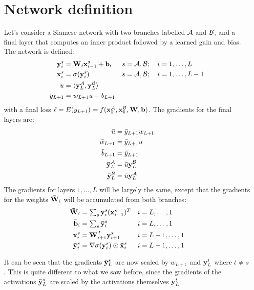 \section{Network definition}

Let's consider a Siamese network with two branches labelled $\mathcal{A}$ and $\mathcal{B}$, and a final layer that computes an inner product followed by a learned gain and bias.
The network is defined:
\begin{align}
\boldsymbol{\mathbf{y}}_{i}^{s} & = \boldsymbol{\mathbf{W}}_{i} \boldsymbol{\mathbf{x}}_{i - 1}^{s} + \boldsymbol{\mathbf{b}}_{i} && s = \mathcal{A}, \mathcal{B}; \quad i = 1, \dots, L\\
\boldsymbol{\mathbf{x}}_{i}^{s} & = \sigma(\boldsymbol{\mathbf{y}}_{i}^{s}) && s = \mathcal{A}, \mathcal{B}; \quad i = 1, \dots, L - 1 \\
u & = \langle \boldsymbol{\mathbf{y}}_{L}^{\mathcal{A}}, \boldsymbol{\mathbf{y}}_{L}^{\mathcal{B}} \rangle \\
y_{L+1} & = w_{L+1} u + b_{L+1}
\end{align}
with a final loss $\ell = E(y_{L + 1}) = f(\boldsymbol{\mathbf{x}}_{0}^{\mathcal{A}}, \boldsymbol{\mathbf{x}}_{0}^{\mathcal{B}}, \mathbf{W}, \mathbf{b})$.
The gradients for the final layers are:
\begin{align}
\bar{u} & = \bar{y}_{L+1} w_{L+1} \\
\bar{w}_{L+1} & = \bar{y}_{L+1} u \\
\bar{b}_{L+1} & = \bar{y}_{L+1} \\
\boldsymbol{\mathbf{\bar{y}}}_{L}^{\mathcal{A}} & = \bar{u} \boldsymbol{\mathbf{y}}_{L}^{\mathcal{B}} \\
\boldsymbol{\mathbf{\bar{y}}}_{L}^{\mathcal{B}} & = \bar{u} \boldsymbol{\mathbf{y}}_{L}^{\mathcal{A}}
\end{align}
The gradients for layers $1, \dots, L$ will be largely the same, except that the gradients for the weights $\boldsymbol{\mathbf{\bar{W}}}_{i}$ will be accumulated from both branches:
\begin{align}
\boldsymbol{\mathbf{\bar{W}}}_{i} & = \textstyle \sum_{s} \boldsymbol{\mathbf{\bar{y}}}_{i}^{s} (\boldsymbol{\mathbf{x}}_{i - 1}^{s})^T && i = L, \dots, 1 \\
\boldsymbol{\mathbf{\bar{b}}}_{i} & = \textstyle \sum_{s} \boldsymbol{\mathbf{\bar{y}}}_{i}^{s} && i = L, \dots, 1 \\
\boldsymbol{\mathbf{\bar{x}}}_{i}^{s} & = \boldsymbol{\mathbf{W}}_{i + 1}^T \boldsymbol{\mathbf{\bar{y}}}_{i + 1}^{s} && i = L-1, \dots, 1 \\
\boldsymbol{\mathbf{\bar{y}}}_{i}^{s} & = \nabla\sigma(\boldsymbol{\mathbf{y}}_{i}^{s}) \odot \boldsymbol{\mathbf{\bar{x}}}_{i}^{s} && i = L - 1, \dots, 1
\end{align}


It can be seen that the gradients $\boldsymbol{\mathbf{\bar{y}}}_{L}^{s}$ are now scaled by $w_{L+1}$ and $\boldsymbol{\mathbf{y}}_{L}^{t}$ where $t \ne s$.
This is quite different to what we saw before, since the gradients of the activations $\boldsymbol{\mathbf{\bar{y}}}_{L}^{s}$ are scaled by the activations themselves $\boldsymbol{\mathbf{y}}_{L}^{t}$.

